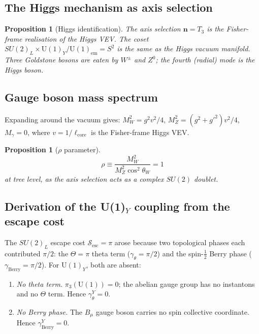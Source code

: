 \documentclass[12pt]{article}
\newtheorem{proposition}[theorem]{Proposition}
\theoremstyle{definition}
\theoremstyle{remark}
\begin{document}
\subsection{The Higgs mechanism as axis selection}

\begin{proposition}[Higgs identification]
The axis selection $\mathbf{n}=T_3$ is the Fisher-frame realisation of the Higgs
VEV.  The coset $SU(2)_L\times\mathrm{U}(1)_Y/\mathrm{U}(1)_{\mathrm{em}}=S^2$
is the same as the Higgs vacuum manifold.  Three Goldstone bosons are eaten
by $W^\pm$ and $Z^0$; the fourth (radial) mode is the Higgs boson.
\end{proposition}

\subsection{Gauge boson mass spectrum}

Expanding around the vacuum gives:
$M_W^2=g^2v^2/4$, $M_Z^2=(g^2+g'^2)v^2/4$, $M_\gamma=0$,
where $v=1/\ell_{\mathrm{core}}$ is the Fisher-frame Higgs VEV.

\begin{proposition}[$\rho$ parameter]
\begin{equation}
\rho\equiv\frac{M_W^2}{M_Z^2\cos^2\theta_W}=1
\end{equation}
at tree level, as the axis selection acts as a complex $SU(2)$ doublet.
\end{proposition}

\subsection{Derivation of the U(1)$_Y$ coupling from the escape cost}

The $SU(2)_L$ escape cost $\mathcal{S}_{\mathrm{esc}}=\pi$ arose because two
topological phases each contributed $\pi/2$: the $\Theta=\pi$ theta term
($\gamma_\theta=\pi/2$) and the spin-$\tfrac{1}{2}$ Berry phase
($\gamma_{\mathrm{Berry}}=\pi/2$).  For $\mathrm{U}(1)_Y$, both are absent:

\begin{enumerate}
\item \emph{No theta term.}  $\pi_3(\mathrm{U}(1))=0$; the abelian gauge group
  has no instantons and no $\Theta$ term.  Hence $\gamma_\theta^Y=0$.
\item \emph{No Berry phase.}  The $B_\mu$ gauge boson carries no spin
  collective coordinate.  Hence $\gamma_{\mathrm{Berry}}^Y=0$.
\end{enumerate}
\end{document}
